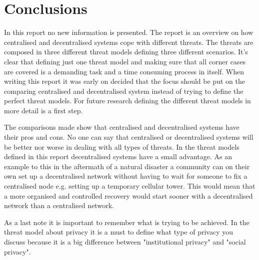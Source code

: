 \section{Conclusions}
In this report no new information is presented.
The report is an overview on how centralised and decentralised systems cope with different threats.
The threats are composed in three different threat models defining three different scenarios.
It's clear that defining just one threat model and making sure that all corner cases are covered is a demanding task and a time consuming process in itself.
When writing this report it was early on decided that the focus should be put on the comparing centralised and decentralised system instead of trying to define the perfect threat models.
For future research defining the different threat models in more detail is a first step.

The comparisons made show that centralised and decentralised systems have their pros and cons.
No one can say that centralised or decentralised systems will be better nor worse in dealing with all types of threats.
In the threat models defined in this report decentralised systems have a small advantage.
As an example to this in the aftermath of a natural disaster a community can on their own set up a decentralised network without having to wait for someone to fix a centralised node e.g. setting up a temporary cellular tower.
This would mean that a more organised and controlled recovery would start sooner with a decentralised network than a centralised network.

As a last note it is important to remember what is trying to be achieved.
In the threat model about privacy it is a must to define what type of privacy you discuss because it is a big difference between "institutional privacy" and "social privacy".
